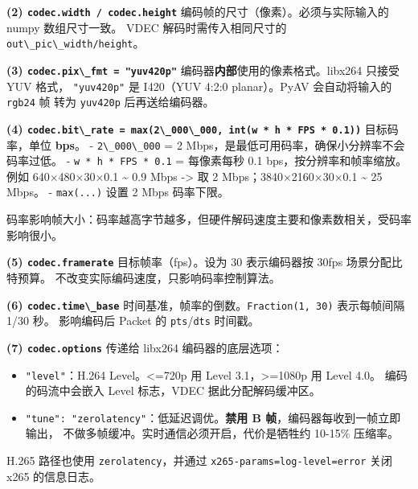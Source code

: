 \textbf{(2) \passthrough{\lstinline!codec.width / codec.height!}}
编码帧的尺寸（像素）。必须与实际输入的 numpy 数组尺寸一致。 VDEC
解码时需传入相同尺寸的
\passthrough{\lstinline!out\_pic\_width/height!}。

\textbf{(3) \passthrough{\lstinline!codec.pix\_fmt = "yuv420p"!}}
编码器\textbf{内部}使用的像素格式。libx264 只接受 YUV 格式，
\passthrough{\lstinline!"yuv420p"!} 是 I420（YUV 4:2:0 planar）。PyAV
会自动将输入的 \passthrough{\lstinline!rgb24!} 帧 转为
\passthrough{\lstinline!yuv420p!} 后再送给编码器。

\textbf{(4)
\passthrough{\lstinline!codec.bit\_rate = max(2\_000\_000, int(w * h * FPS * 0.1))!}}
目标码率，单位 \textbf{bps}。 - \passthrough{\lstinline!2\_000\_000!} =
2 Mbps，是最低可用码率，确保小分辨率不会码率过低。 -
\passthrough{\lstinline!w * h * FPS * 0.1!} = 每像素每秒 0.1
bps，按分辨率和帧率缩放。 例如 640×480×30×0.1 \textasciitilde{} 0.9 Mbps
-\textgreater{} 取 2 Mbps；3840×2160×30×0.1 \textasciitilde{} 25 Mbps。
- \passthrough{\lstinline!max(...)!} 设置 2 Mbps 码率下限。

码率影响帧大小：码率越高字节越多，但硬件解码速度主要和像素数相关，受码率影响很小。

\textbf{(5) \passthrough{\lstinline!codec.framerate!}}
目标帧率（fps）。设为 30 表示编码器按 30fps 场景分配比特预算。
不改变实际编码速度，只影响码率控制算法。

\textbf{(6) \passthrough{\lstinline!codec.time\_base!}}
时间基准，帧率的倒数。\passthrough{\lstinline!Fraction(1, 30)!}
表示每帧间隔 1/30 秒。 影响编码后 Packet 的
\passthrough{\lstinline!pts!}/\passthrough{\lstinline!dts!} 时间戳。

\textbf{(7) \passthrough{\lstinline!codec.options!}} 传递给 libx264
编码器的底层选项：

\begin{itemize}
\tightlist
\item
  \passthrough{\lstinline!"level"!}：H.264 Level。\textless=720p 用
  Level 3.1，\textgreater=1080p 用 Level 4.0。 编码的码流中会嵌入 Level
  标志，VDEC 据此分配解码缓冲区。
\item
  \passthrough{\lstinline!"tune": "zerolatency"!}：低延迟调优。\textbf{禁用
  B 帧}，编码器每收到一帧立即输出，
  不做多帧缓冲。实时通信必须开启，代价是牺牲约 10-15\% 压缩率。
\end{itemize}

H.265 路径也使用 \passthrough{\lstinline!zerolatency!}，并通过
\passthrough{\lstinline!x265-params=log-level=error!} 关闭 x265
的信息日志。

